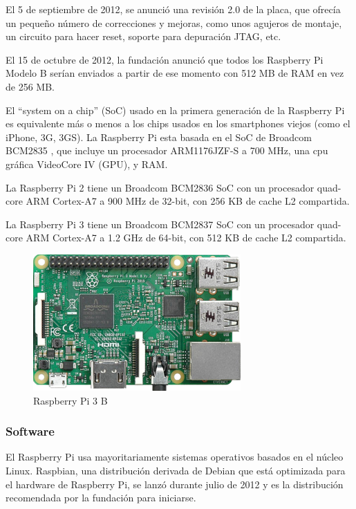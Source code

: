 \documentclass[a4paper,11pt,oneside]{book}
\begin{document}
El 5 de septiembre de 2012, se anunció una revisión 2.0 de la placa, que ofrecía un pequeño número de correcciones y mejoras, como unos agujeros de montaje, un circuito para hacer reset, soporte para depuración JTAG, etc.

El 15 de octubre de 2012, la fundación anunció que todos los Raspberry Pi Modelo B serían enviados a partir de ese momento con 512 MB de RAM en vez de 256 MB.

El ``system on a chip'' (SoC) usado en la primera generación de la Raspberry Pi es equivalente más o menos a los chips usados en los smartphones viejos (como el iPhone, 3G, 3GS). La Raspberry Pi esta basada en el SoC de Broadcom BCM2835 , que incluye un procesador ARM1176JZF-S a  700 MHz, una cpu gráfica VideoCore IV (GPU), y RAM. 

La Raspberry Pi 2 tiene un Broadcom BCM2836 SoC  con un procesador quad-core ARM Cortex-A7 a 900 MHz de 32-bit, con 256 KB de cache L2 compartida.

La Raspberry Pi 3 tiene un Broadcom BCM2837 SoC  con un procesador quad-core ARM Cortex-A7 a 1.2 GHz de 64-bit, con 512 KB de cache L2 compartida.

\begin{figure}[H]
\begin{center}
\includegraphics[scale=0.5]{Imagenes/Raspberry_Pi_3_Model_B.png}
\caption{Raspberry Pi 3 B}
\label{Raspberry Pi 3 B}
\end{center}
\end{figure}

\subsubsection{Software}
El Raspberry Pi usa mayoritariamente sistemas operativos basados en el núcleo Linux. Raspbian, una distribución derivada de Debian que está optimizada para el hardware de Raspberry Pi, se lanzó durante julio de 2012 y es la distribución recomendada por la fundación para iniciarse.
\end{document}

